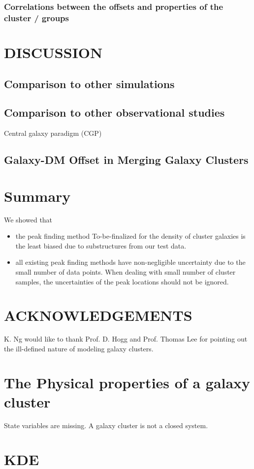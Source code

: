 \documentclass[usenatbib]{mn2e}
\begin{document}
\subsubsection{Correlations between the offsets and properties of the cluster / groups}
\section{DISCUSSION}
\subsection{Comparison to other simulations}
\subsection{Comparison to other observational studies}
Central galaxy paradigm (CGP)


\subsection{Galaxy-DM Offset in Merging Galaxy Clusters}



\section{Summary}
We showed that 
\begin{itemize}
		\item  the peak finding method To-be-finalized for the density of cluster
			galaxies is the least biased due to substructures from our test data. 
		\item  all existing peak finding methods have non-negligible uncertainty 
			due to the small number of data points. When dealing with small number of
			cluster samples, the uncertainties of the peak locations should not be
			ignored.
\end{itemize}




\section{ACKNOWLEDGEMENTS}
K. Ng would like to thank Prof. D. Hogg and Prof. Thomas Lee for pointing out the ill-defined nature of
modeling galaxy clusters.

\appendix 
\section{The Physical properties of a galaxy cluster}
State variables are missing.
A galaxy cluster is not a closed system. 






\appendix
\section{KDE}
\clearpage\bsp\label{lastpage} 
\end{document}
